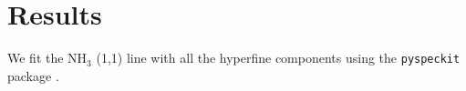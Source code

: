 \section{Results}

We fit the NH$_3$ (1,1) line with all the hyperfine components using the \verb+pyspeckit+ package \cite{2011ascl.soft09001G}. 